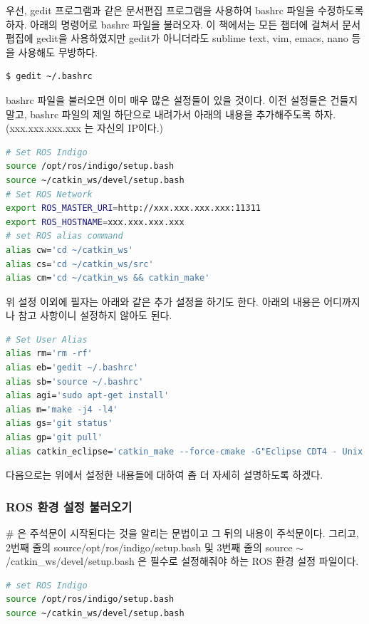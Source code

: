 우선, gedit 프로그램과 같은 문서편집 프로그램을 사용하여 bashrc 파일을 수정하도록 하자. 아래의 명령어로 bashrc 파일을 불러오자. 이 책에서는 모든 챕터에 걸쳐서 문서폅집에 gedit을 사용하였지만 gedit가 아니더라도 sublime text, vim, emacs, nano 등을 사용해도 무방하다.
\\
\begin{lstlisting}[language=ROS]
$ gedit ~/.bashrc
\end{lstlisting}

bashrc 파일을 불러오면 이미 매우 많은 설정들이 있을 것이다. 이전 설정들은 건들지 말고, bashrc 파일의 제일 하단으로 내려가서 아래의 내용을 추가해주도록 하자. (xxx.xxx.xxx.xxx 는 자신의 IP이다.)
\\
\begin{lstlisting}[language=bash]
# Set ROS Indigo
source /opt/ros/indigo/setup.bash
source ~/catkin_ws/devel/setup.bash
# Set ROS Network
export ROS_MASTER_URI=http://xxx.xxx.xxx.xxx:11311
export ROS_HOSTNAME=xxx.xxx.xxx.xxx
# set ROS alias command
alias cw='cd ~/catkin_ws'
alias cs='cd ~/catkin_ws/src'
alias cm='cd ~/catkin_ws && catkin_make'
\end{lstlisting}

위 설정 이외에 필자는 아래와 같은 추가 설정을 하기도 한다. 아래의 내용은 어디까지나 참고 사항이니 설정하지 않아도 된다.
\\
\begin{lstlisting}[language=bash]
# Set User Alias
alias rm='rm -rf' 
alias eb='gedit ~/.bashrc' 
alias sb='source ~/.bashrc'
alias agi='sudo apt-get install'  
alias m='make -j4 -l4'  
alias gs='git status'  
alias gp='git pull'
alias catkin_eclipse='catkin_make --force-cmake -G"Eclipse CDT4 - Unix Makefiles"'
\end{lstlisting}

\noindent
다음으로는 위에서 설정한 내용들에 대하여 좀 더 자세히 설명하도록 하겠다.

\subsubsection{ROS 환경 설정 불러오기}
\# 은 주석문이 시작된다는 것을 알리는 문법이고 그 뒤의 내용이 주석문이다. 그리고, 2번째 줄의 source/opt/ros/indigo/setup.bash 및 3번째 줄의 source $\sim$/catkin\_ws/devel/setup.bash 은 필수로 설정해줘야 하는 ROS 환경 설정 파일이다.
\\
\begin{lstlisting}[language=bash]
# set ROS Indigo
source /opt/ros/indigo/setup.bash
source ~/catkin_ws/devel/setup.bash
\end{lstlisting}

